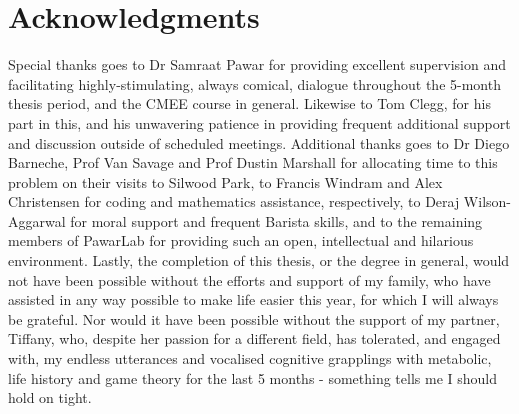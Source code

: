 \documentclass[a4paper]{article} %
\begin{document}
\section*{Acknowledgments}\thispagestyle{plain}
    Special thanks goes to Dr Samraat Pawar for providing excellent supervision and facilitating  highly-stimulating, always comical, dialogue throughout the 5-month thesis period, and the CMEE course in general. Likewise to Tom Clegg, for his part in this, and his unwavering patience in providing frequent additional support and discussion outside of scheduled meetings. Additional thanks goes to Dr Diego Barneche, Prof Van Savage and Prof Dustin Marshall for allocating time to this problem on their visits to Silwood Park, to Francis Windram and Alex Christensen for coding and mathematics assistance, respectively, to Deraj Wilson-Aggarwal for moral support and frequent Barista skills, and to the remaining members of PawarLab for providing such an open, intellectual and hilarious environment. Lastly, the completion of this thesis, or the degree in general, would not have been possible without the efforts and support of my family, who have assisted in any way possible to make life easier this year, for which I will always be grateful. Nor would it have been possible without the support of my partner, Tiffany, who, despite her passion for a different field, has tolerated, and engaged with, my endless utterances and vocalised cognitive grapplings with metabolic, life history and game theory for the last 5 months - something tells me I should hold on tight.

\newpage\tableofcontents\thispagestyle{plain}

\newpage\listoffigures\thispagestyle{plain}


\newpage
\end{document}

